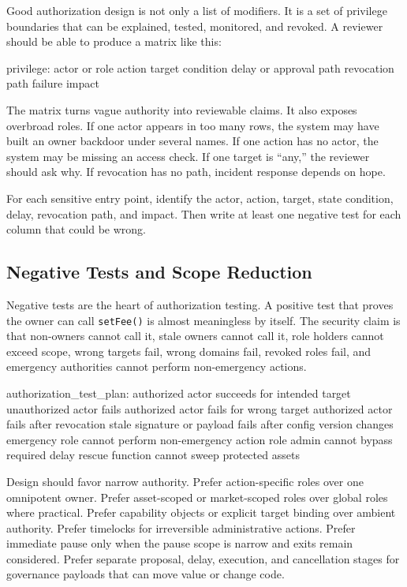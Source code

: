 Good authorization design is not only a list of modifiers. It is a set of privilege boundaries that can be explained, tested, monitored, and revoked. A reviewer should be able to produce a matrix like this:

\begin{codeblock}
privilege:
    actor or role
    action
    target
    condition
    delay or approval path
    revocation path
    failure impact
\end{codeblock}

The matrix turns vague authority into reviewable claims. It also exposes overbroad roles. If one actor appears in too many rows, the system may have built an owner backdoor under several names. If one action has no actor, the system may be missing an access check. If one target is ``any,'' the reviewer should ask why. If revocation has no path, incident response depends on hope.

\begin{artifactbox}
For each sensitive entry point, identify the actor, action, target, state condition, delay, revocation path, and impact. Then write at least one negative test for each column that could be wrong.
\end{artifactbox}

\subsection{Negative Tests and Scope Reduction}

Negative tests are the heart of authorization testing. A positive test that proves the owner can call \texttt{setFee()} is almost meaningless by itself. The security claim is that non-owners cannot call it, stale owners cannot call it, role holders cannot exceed scope, wrong targets fail, wrong domains fail, revoked roles fail, and emergency authorities cannot perform non-emergency actions.

\begin{codeblock}
authorization_test_plan:
    authorized actor succeeds for intended target
    unauthorized actor fails
    authorized actor fails for wrong target
    authorized actor fails after revocation
    stale signature or payload fails after config version changes
    emergency role cannot perform non-emergency action
    role admin cannot bypass required delay
    rescue function cannot sweep protected assets
\end{codeblock}

Design should favor narrow authority. Prefer action-specific roles over one omnipotent owner. Prefer asset-scoped or market-scoped roles over global roles where practical. Prefer capability objects or explicit target binding over ambient authority. Prefer timelocks for irreversible administrative actions. Prefer immediate pause only when the pause scope is narrow and exits remain considered. Prefer separate proposal, delay, execution, and cancellation stages for governance payloads that can move value or change code.

